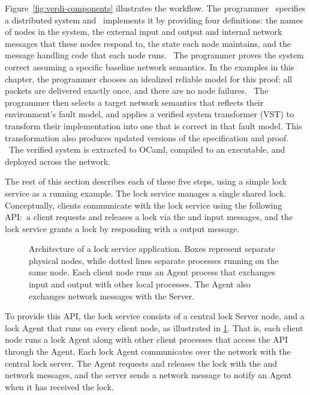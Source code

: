 Figure~\ref{fig:verdi-components} illustrates the \Verdi workflow.
%
The programmer ~specifies a distributed system and
~implements it by providing four definitions: the names
of nodes in the system, the external input and output and internal
network messages that these nodes respond to, the state each node
maintains, and the message handling code that each node runs.
%
~The programmer proves the system correct assuming a
specific baseline network semantics. In the examples in this chapter,
the programmer chooses an idealized reliable model for this proof:
all packets are delivered exactly once, and there are no node failures.
%
~The programmer then selects a target network semantics
that reflects their environment's fault model, and applies a
verified system transformer
(VST) to transform their implementation into one that is correct in
that fault model.  This transformation also produces updated
versions of the specification and proof.
%
~The verified system is extracted to OCaml, compiled to an
executable, and deployed across the network.

The rest of this section describes each of these five steps, using a simple
lock service as a running example.
%
The lock service manages a single shared lock.
%
Conceptually, clients communicate with the lock service using the following
API:\ a client requests and releases a lock via the \LockIO and \UnlockIO
input messages, and the lock service grants a lock by responding with a
\GrantIO output message.

\begin{figure}[t]
  \centering
  

  \caption{Architecture of a lock service application. Boxes represent separate
    physical nodes, while dotted lines separate processes running on
    the same node.  Each client node runs an Agent process that
    exchanges input and output with other local processes.  The Agent
    also exchanges network messages with the Server.}

\label{fig:lock-service-architecture}
\end{figure}

To provide this API, the lock service consists of a central lock Server
node, and a lock Agent that runs on every client node, as illustrated in
\cref{fig:lock-service-architecture}.
%
That is, each client node runs a lock Agent along with other client
processes that access the API through the Agent.
%
Each lock Agent communicates over the network with the central lock server.
%
The Agent requests and releases the lock with the \LockMsg and \UnlockMsg
network messages, and the server sends a \GrantMsg network message to
notify an Agent when it has received the lock.
%

